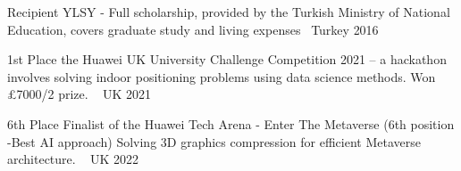 


\begin{cvhonors}
  \cvhonor
    {Recipient} %
    {YLSY - Full scholarship, provided by the Turkish Ministry of National Education, covers graduate study and living expenses~\href{https://prezi.com/mgf39brhrswv/ylsy-turkish-goverment-funded-scholarship-program/}{\faExternalLink}} %
    {Turkey} %
    {2016} %

  \cvhonor
    {1st Place} %
    {the Huawei UK University Challenge Competition 2021 -- a hackathon involves solving indoor positioning problems using data science methods. Won £7000/2 prize. \href{https://github.com/kahramankostas/Huawei-UK-University-Challenge-Competition-2021}{\faGithub}~\href{https://twitter.com/HuaweiUK/status/1486712513404104709}{\faTwitter}} %
    {UK} %
    {2021} %



  \cvhonor
    {6th Place} %
    {Finalist of the Huawei Tech Arena - Enter The Metaverse (6th position -Best AI approach)
Solving 3D graphics compression for efficient Metaverse architecture. \href{https://github.com/UKTechArena/}{\faGithub}~\href{https://www.linkedin.com/posts/bemyapp_techarenauk2022-activity-7003014375015882752-0GbR9}{\faExternalLink}}  %
    {UK} %
    {2022} %










\end{cvhonors}